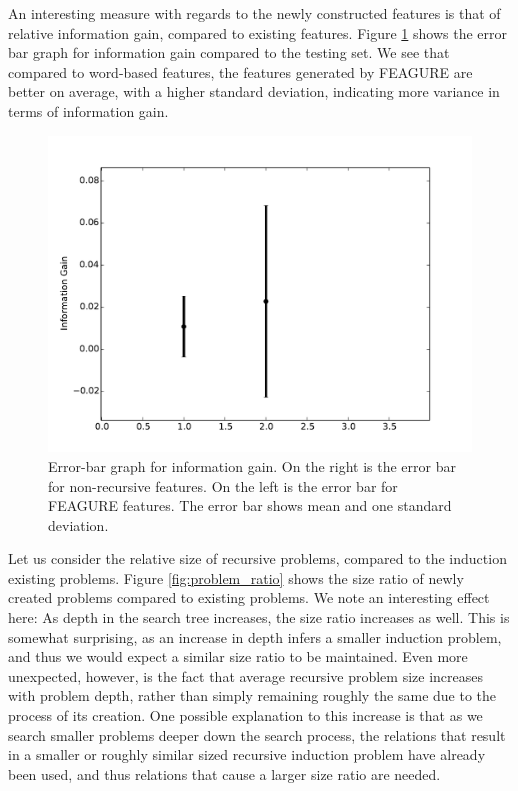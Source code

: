 \documentclass[twoside,11pt]{article}
\theoremstyle{definition}
\begin{document}
An interesting measure with regards to the newly constructed features is that of relative information gain, compared to existing features. Figure \ref{fig:ig_errorbars} shows the error bar graph for information gain compared to the testing set. We see that compared to word-based features, the features generated by FEAGURE are better on average, with a higher standard deviation, indicating more variance in terms of information gain.

\begin{figure}
	\centering
	\includegraphics[width=0.8\linewidth]{ig_errorbars}
	\caption{Error-bar graph for information gain. On the right is the error bar for non-recursive features. On the left is the error bar for FEAGURE features.
		The error bar shows mean and one standard deviation.}
	\label{fig:ig_errorbars}
\end{figure}

Let us consider the relative size of recursive problems, compared to the induction existing problems. Figure \ref{fig:problem_ratio} shows the size ratio of newly created problems compared to existing problems. We note an interesting effect here:
As depth in the search tree increases, the size ratio increases as well. This is somewhat surprising, as an increase in depth infers a smaller induction problem, and thus we would expect a similar size ratio to be maintained. Even more unexpected, however, is the fact that average recursive problem size increases with problem depth, rather than simply remaining roughly the same due to the process of its creation. One possible explanation to this increase is that as we search smaller problems deeper down the search process, the relations that result in a smaller or roughly similar sized recursive induction problem have already been used, and thus relations that cause a larger size ratio are needed.
\end{document}
